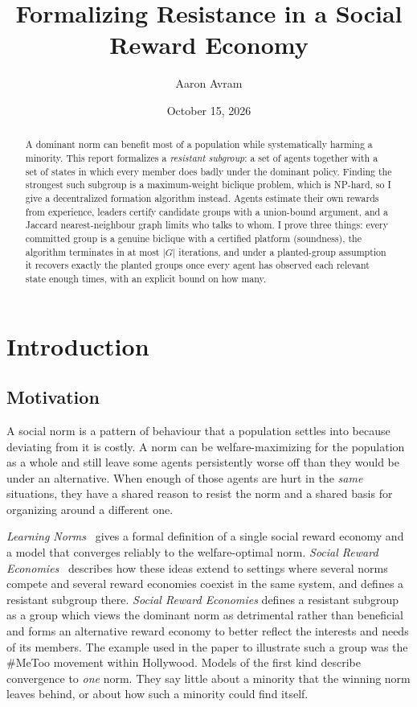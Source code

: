 \documentclass[11pt]{article}
\title{Formalizing Resistance in a Social Reward Economy}
\author{Aaron Avram}
\date{October 15, 2026}
\theoremstyle{plain}
\theoremstyle{definition}
\theoremstyle{remark}
\begin{document}
\maketitle
 
\begin{abstract}
\noindent
A dominant norm can benefit most of a population while systematically harming a minority.
This report formalizes a \emph{resistant subgroup}: a set of agents together with a set of states
in which every member does badly under the dominant policy.
Finding the strongest such subgroup is a maximum-weight biclique problem, which is NP-hard,
so I give a decentralized formation algorithm instead. Agents estimate their own rewards from experience,
leaders certify candidate groups with a union-bound argument, and a Jaccard nearest-neighbour graph limits who talks to whom.
I prove three things: every committed group is a genuine biclique with a certified platform (soundness),
the algorithm terminates in at most $|G|$ iterations, and under a planted-group assumption it recovers exactly the planted groups
once every agent has observed each relevant state enough times, with an explicit bound on how many.
\end{abstract}
 
 
 
\section{Introduction}
 
\subsection{Motivation}
A social norm is a pattern of behaviour that a population settles into because deviating from it is costly.
A norm can be welfare-maximizing for the population as a whole and still leave some agents
persistently worse off than they would be under an alternative. When enough of those agents are
hurt in the \emph{same} situations, they have a shared reason to resist the norm and a shared basis for
organizing around a different one.
 
\textit{Learning Norms}~\cite{learningnorms} gives a formal definition of a single social reward economy and a
model that converges reliably to the welfare-optimal norm. \textit{Social Reward Economies}~\cite{sre}
describes how these ideas extend to settings where several norms compete and several reward economies coexist in
the same system, and defines a resistant subgroup there. \textit{Social Reward Economies} defines a resistant subgroup
as a group which views the dominant norm as detrimental rather than beneficial and
forms an alternative reward economy to better reflect the interests and needs of its members.
The example used in the paper to illustrate such a group was the \#MeToo movement within Hollywood.
Models of the first kind describe convergence to \emph{one} norm. They say little about a minority that
the winning norm leaves behind, or about how such a minority could find itself.
 
\end{document}
